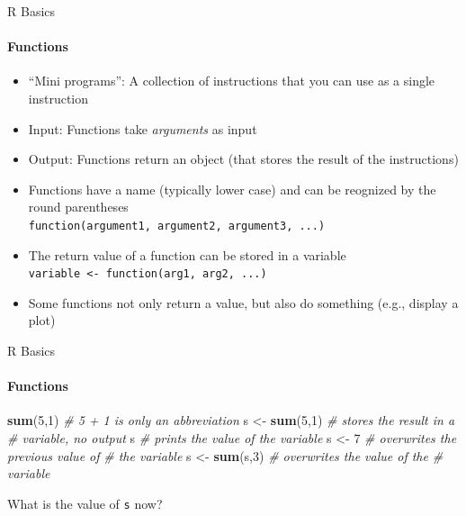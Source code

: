\documentclass[ignorenonframetext,]{beamer}
\newenvironment{Shaded}{\begin{snugshade}}{\end{snugshade}}
\newcommand{\CommentTok}[1]{\textcolor[rgb]{0.56,0.35,0.01}{\textit{#1}}}
\newcommand{\DecValTok}[1]{\textcolor[rgb]{0.00,0.00,0.81}{#1}}
\newcommand{\KeywordTok}[1]{\textcolor[rgb]{0.13,0.29,0.53}{\textbf{#1}}}
\newcommand{\NormalTok}[1]{#1}
\newcommand{\StringTok}[1]{\textcolor[rgb]{0.31,0.60,0.02}{#1}}
\providecommand{\tightlist}{%
  \setlength{\itemsep}{0pt}\setlength{\parskip}{0pt}}
\begin{document}
\begin{frame}[fragile]{R Basics}
\protect\hypertarget{r-basics-5}{}

\framesubtitle{Functions}

\begin{itemize}
\tightlist
\item
  ``Mini programs'': A collection of instructions that you can use as a
  single instruction
\item
  Input: Functions take \emph{arguments} as input
\item
  Output: Functions return an object (that stores the result of the
  instructions) \pause
\item
  Functions have a name (typically lower case) and can be reognized by
  the round parentheses\\
  \texttt{function(argument1,\ argument2,\ argument3,\ ...)}
\item
  The return value of a function can be stored in a variable\\
  \texttt{variable\ \textless{}-\ function(arg1,\ arg2,\ ...)} \pause
\item
  Some functions not only return a value, but also do something (e.g.,
  display a plot)
\end{itemize}

\end{frame}

\begin{frame}[fragile]{R Basics}
\protect\hypertarget{r-basics-6}{}

\framesubtitle{Functions}

\begin{Shaded}
\begin{Highlighting}[]
\KeywordTok{sum}\NormalTok{(}\DecValTok{5}\NormalTok{,}\DecValTok{1}\NormalTok{)         }\CommentTok{# 5 + 1 is only an abbreviation}
\NormalTok{s <-}\StringTok{ }\KeywordTok{sum}\NormalTok{(}\DecValTok{5}\NormalTok{,}\DecValTok{1}\NormalTok{)    }\CommentTok{# stores the result in a }
                 \CommentTok{# variable, no output}
\NormalTok{s                }\CommentTok{# prints the value of the variable}
\NormalTok{s <-}\StringTok{ }\DecValTok{7}           \CommentTok{# overwrites the previous value of }
                 \CommentTok{# the variable}
\NormalTok{s <-}\StringTok{ }\KeywordTok{sum}\NormalTok{(s,}\DecValTok{3}\NormalTok{)    }\CommentTok{# overwrites the value of the }
                 \CommentTok{# variable}
\end{Highlighting}
\end{Shaded}

What is the value of \texttt{s} now?

\end{frame}
\end{document}
